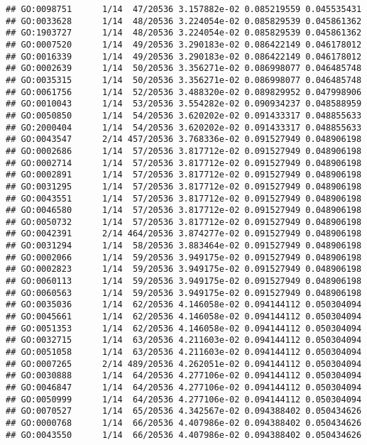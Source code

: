 \documentclass[
]{article}
\begin{document}
\begin{verbatim}
## GO:0098751      1/14  47/20536 3.157882e-02 0.085219559 0.045535431
## GO:0033628      1/14  48/20536 3.224054e-02 0.085829539 0.045861362
## GO:1903727      1/14  48/20536 3.224054e-02 0.085829539 0.045861362
## GO:0007520      1/14  49/20536 3.290183e-02 0.086422149 0.046178012
## GO:0016339      1/14  49/20536 3.290183e-02 0.086422149 0.046178012
## GO:0002639      1/14  50/20536 3.356271e-02 0.086998077 0.046485748
## GO:0035315      1/14  50/20536 3.356271e-02 0.086998077 0.046485748
## GO:0061756      1/14  52/20536 3.488320e-02 0.089829952 0.047998906
## GO:0010043      1/14  53/20536 3.554282e-02 0.090934237 0.048588959
## GO:0050850      1/14  54/20536 3.620202e-02 0.091433317 0.048855633
## GO:2000404      1/14  54/20536 3.620202e-02 0.091433317 0.048855633
## GO:0043547      2/14 457/20536 3.768336e-02 0.091527949 0.048906198
## GO:0002686      1/14  57/20536 3.817712e-02 0.091527949 0.048906198
## GO:0002714      1/14  57/20536 3.817712e-02 0.091527949 0.048906198
## GO:0002891      1/14  57/20536 3.817712e-02 0.091527949 0.048906198
## GO:0031295      1/14  57/20536 3.817712e-02 0.091527949 0.048906198
## GO:0043551      1/14  57/20536 3.817712e-02 0.091527949 0.048906198
## GO:0046580      1/14  57/20536 3.817712e-02 0.091527949 0.048906198
## GO:0050732      1/14  57/20536 3.817712e-02 0.091527949 0.048906198
## GO:0042391      2/14 464/20536 3.874277e-02 0.091527949 0.048906198
## GO:0031294      1/14  58/20536 3.883464e-02 0.091527949 0.048906198
## GO:0002066      1/14  59/20536 3.949175e-02 0.091527949 0.048906198
## GO:0002823      1/14  59/20536 3.949175e-02 0.091527949 0.048906198
## GO:0060113      1/14  59/20536 3.949175e-02 0.091527949 0.048906198
## GO:0060563      1/14  59/20536 3.949175e-02 0.091527949 0.048906198
## GO:0035036      1/14  62/20536 4.146058e-02 0.094144112 0.050304094
## GO:0045661      1/14  62/20536 4.146058e-02 0.094144112 0.050304094
## GO:0051353      1/14  62/20536 4.146058e-02 0.094144112 0.050304094
## GO:0032715      1/14  63/20536 4.211603e-02 0.094144112 0.050304094
## GO:0051058      1/14  63/20536 4.211603e-02 0.094144112 0.050304094
## GO:0007265      2/14 489/20536 4.262051e-02 0.094144112 0.050304094
## GO:0030888      1/14  64/20536 4.277106e-02 0.094144112 0.050304094
## GO:0046847      1/14  64/20536 4.277106e-02 0.094144112 0.050304094
## GO:0050999      1/14  64/20536 4.277106e-02 0.094144112 0.050304094
## GO:0070527      1/14  65/20536 4.342567e-02 0.094388402 0.050434626
## GO:0000768      1/14  66/20536 4.407986e-02 0.094388402 0.050434626
## GO:0043550      1/14  66/20536 4.407986e-02 0.094388402 0.050434626

\end{verbatim}
\end{document}
